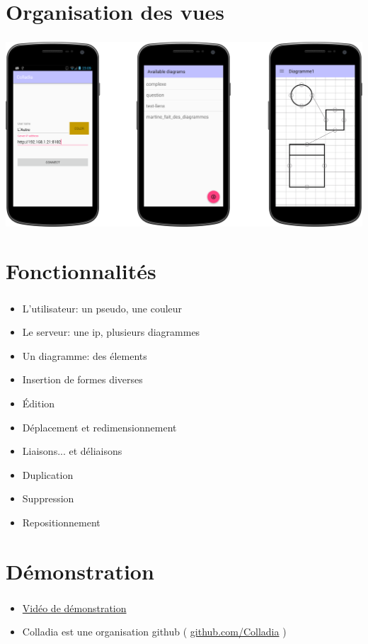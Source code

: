 \documentclass[11pt]{beamer}
\begin{document}
\section{Organisation des vues}
\begin{frame}
	\frametitle{\currentname}
	\begin{center}
		\includegraphics[width=\textwidth]{img/screens}
	\end{center}
\end{frame}

\section{Fonctionnalités}
\begin{frame}
	\frametitle{\currentname}
\begin{itemize}
  \item L'utilisateur: un pseudo, une couleur
  \item Le serveur: une ip, plusieurs diagrammes
  \item Un diagramme: des élements
  \vspace*{\fill}
\pause
  \item Insertion de formes diverses
  \item Édition
  \item Déplacement et redimensionnement
  \item Liaisons... et déliaisons
  \item Duplication
  \item Suppression
  \item Repositionnement
\end{itemize}
\end{frame}

\section{Démonstration}
\begin{frame}
	\frametitle{\currentname}
	\begin{itemize}
	\item \href{https://www.youtube.com/watch?v=1xX70e88ro8}{Vidéo de démonstration}
  \vspace*{\fill}
	\item Colladia est une organisation github ( \href{https://github.com/Colladia/}{github.com/Colladia} )
	\end{itemize}
\end{frame}
\end{document}
